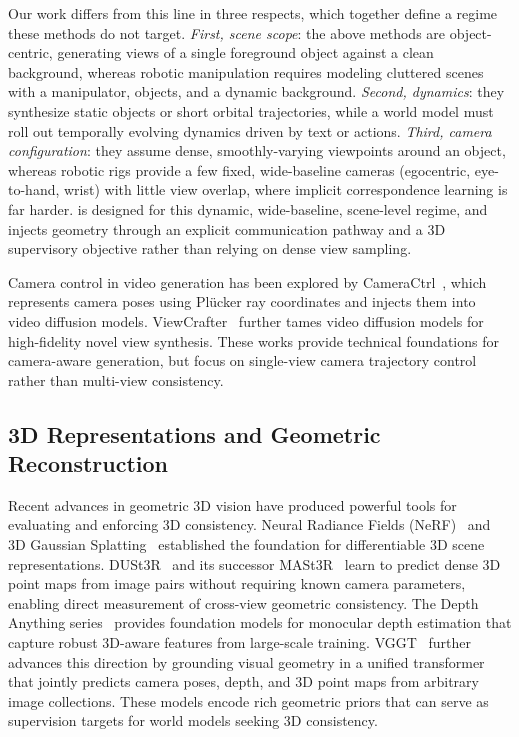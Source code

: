 Our work differs from this line in three respects, which together define a regime these methods do not target. \emph{First, scene scope}: the above methods are object-centric, generating views of a single foreground object against a clean background, whereas robotic manipulation requires modeling cluttered scenes with a manipulator, objects, and a dynamic background. \emph{Second, dynamics}: they synthesize static objects or short orbital trajectories, while a world model must roll out temporally evolving dynamics driven by text or actions. \emph{Third, camera configuration}: they assume dense, smoothly-varying viewpoints around an object, whereas robotic rigs provide a few fixed, wide-baseline cameras (egocentric, eye-to-hand, wrist) with little view overlap, where implicit correspondence learning is far harder. \methodname{} is designed for this dynamic, wide-baseline, scene-level regime, and injects geometry through an explicit communication pathway and a 3D supervisory objective rather than relying on dense view sampling.

Camera control in video generation has been explored by CameraCtrl~\cite{he2024cameractrl}, which represents camera poses using Pl\"ucker ray coordinates and injects them into video diffusion models. ViewCrafter~\cite{yu2024viewcrafter} further tames video diffusion models for high-fidelity novel view synthesis. These works provide technical foundations for camera-aware generation, but focus on single-view camera trajectory control rather than multi-view consistency.

\subsection{3D Representations and Geometric Reconstruction}

Recent advances in geometric 3D vision have produced powerful tools for evaluating and enforcing 3D consistency. Neural Radiance Fields (NeRF)~\cite{mildenhall2020nerf} and 3D Gaussian Splatting~\cite{kerbl2023gaussiansplatting} established the foundation for differentiable 3D scene representations. DUSt3R~\cite{wang2024dust3r} and its successor MASt3R~\cite{leroy2024mast3r} learn to predict dense 3D point maps from image pairs without requiring known camera parameters, enabling direct measurement of cross-view geometric consistency. The Depth Anything series~\cite{yang2024depthanything,yang2024depthanythingv2,lin2025depthanything3} provides foundation models for monocular depth estimation that capture robust 3D-aware features from large-scale training. VGGT~\cite{wang2025vggt} further advances this direction by grounding visual geometry in a unified transformer that jointly predicts camera poses, depth, and 3D point maps from arbitrary image collections. These models encode rich geometric priors that can serve as supervision targets for world models seeking 3D consistency.

